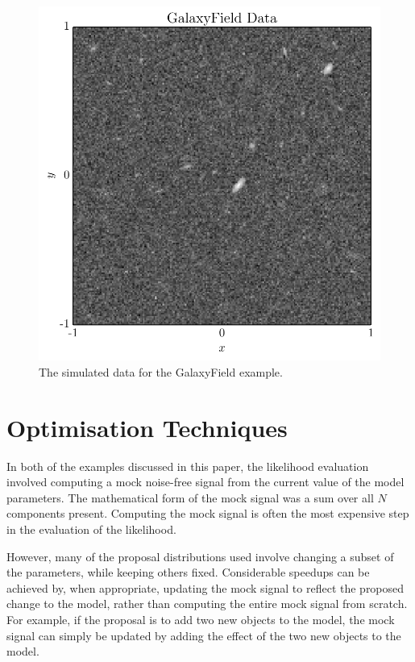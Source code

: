 \documentclass[letterpaper, 11pt]{article}
\begin{document}
\begin{figure}
\begin{center}
\includegraphics[scale=0.7]{galaxyfield_data.pdf}
\caption{The simulated data for the GalaxyField example.
\label{fig:galaxyfield_data}}
\end{center}
\end{figure}



\section{Optimisation Techniques}\label{sec:optimisation}
In both of the examples discussed in this paper, the likelihood evaluation
involved computing a mock noise-free signal from the current value of the
model parameters. The mathematical form of the mock signal was a sum over
all $N$ components present. Computing the mock signal is often the most
expensive step in the evaluation of the likelihood.

However, many of the proposal distributions used involve changing a subset
of the parameters, while keeping others fixed. Considerable speedups can be
achieved by, when appropriate, updating the mock signal to reflect the proposed
change to the model, rather than computing the entire mock signal from scratch.
For example, if the proposal is to add two new objects to the model, the
mock signal can simply be updated by adding the effect of the two new objects
to the model.
\end{document}
